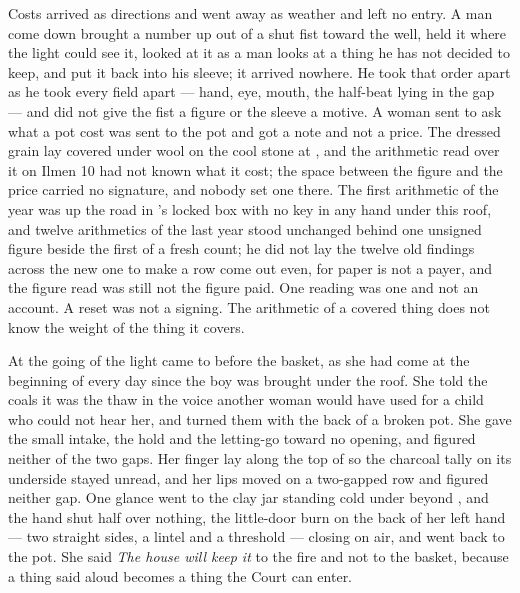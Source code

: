 Costs arrived as directions and went away as weather and left no entry. A man come down  brought a number up out of a shut fist toward the well, held it where the light could see it, looked at it as a man looks at a thing he has not decided to keep, and put it back into his sleeve; it arrived nowhere. He took that order apart as he took every field apart --- hand, eye, mouth, the half-beat lying in the gap --- and did not give the fist a figure or the sleeve a motive. A woman sent to ask what a pot cost was sent to the pot and got a note and not a price. The dressed grain lay covered under wool on the cool stone at , and the arithmetic read over it on Ilmen 10 had not known what it cost; the space between the figure and the price carried no signature, and nobody set one there. The first arithmetic of the year was up the road in 's locked box with no key in any hand under this roof, and twelve arithmetics of the last year stood unchanged behind one unsigned figure beside the first of a fresh count; he did not lay the twelve old findings across the new one to make a row come out even, for paper is not a payer, and the figure read was still not the figure paid. One reading was one and not an account. A reset was not a signing. The arithmetic of a covered thing does not know the weight of the thing it covers.

At the going of the light  came to  before the basket, as she had come at the beginning of every day since the boy was brought under the roof. She told the coals it was the thaw in the voice another woman would have used for a child who could not hear her, and turned them with the back of a broken pot. She gave the small intake, the hold and the letting-go toward no opening, and figured neither of the two gaps. Her finger lay along the top of  so the charcoal tally on its underside stayed unread, and her lips moved on a two-gapped row and figured neither gap. One glance went to the clay jar standing cold under  beyond , and the hand shut half over nothing, the little-door burn on the back of her left hand --- two straight sides, a lintel and a threshold --- closing on air, and went back to the pot. She said \emph{The house will keep it} to the fire and not to the basket, because a thing said aloud becomes a thing the Court can enter.

